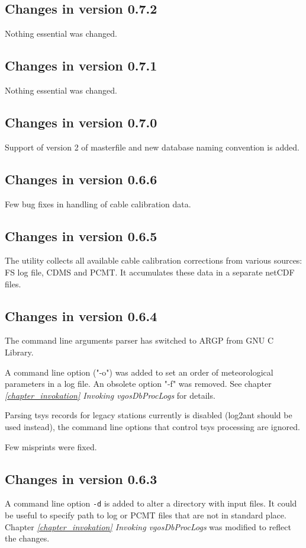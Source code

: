 \documentclass [10pt,letterpaper]{report}
\begin{document}
\subsection{Changes in version 0.7.2}
Nothing essential was changed.

\subsection{Changes in version 0.7.1}
Nothing essential was changed.

\subsection{Changes in version 0.7.0}
Support of version 2 of masterfile and new database naming convention is added.

\subsection{Changes in version 0.6.6}
Few bug fixes in handling of cable calibration data.

\subsection{Changes in version 0.6.5}
The utility collects all available cable calibration corrections from various
sources: FS log file, CDMS and PCMT. It accumulates these data in a separate
netCDF files.


\subsection{Changes in version 0.6.4}
The command line arguments parser has switched to ARGP from GNU C Library.

A command line option ("-o") was added to set an order of meteorological
parameters in a log file. An obsolete option "-f" was removed.
See chapter \emph{\ref{chapter_invokation} Invoking vgosDbProcLogs} for details.

Parsing tsys records for legacy stations currently is disabled (log2ant should
be used instead), the command line options that control tsys processing are
ignored.

Few misprints were fixed.


\subsection{Changes in version 0.6.3}
A command line option {\tt -d} is added to alter a directory with input files.
It could be useful to specify path to log or PCMT files that are not in standard
place. Chapter \emph{\ref{chapter_invokation} Invoking vgosDbProcLogs} was modified
to reflect the changes.
\end{document}
